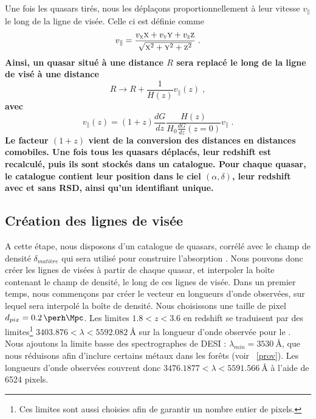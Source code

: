 \documentclass[11pt, twoside, a4paper, openright]{report}
\begin{document}
\paragraph{}
Une fois les quasars tirés, nous les déplaçons proportionnellement à leur vitesse $v_{\parallel}$ le long de la ligne de visée. Celle ci est définie comme
\begin{equation}
  v_{\parallel} = \frac{v_{\textsc{x}} \textsc{x} + v_{\textsc{y}} \textsc{y} + v_{\textsc{z}} \textsc{z}}{\sqrt{\textsc{x}^2 + \textsc{y}^2 + \textsc{z}^2}} \; .
\end{equation}
\textbf{Ainsi, un quasar situé à une distance $R$ sera replacé le long de la ligne de visé à une distance
\begin{equation}
 R \rightarrow  R + \frac{1}{H(z)} v_{\parallel}(z) \; ,  %
\end{equation}
avec
\begin{equation}
 v_{\parallel}(z) = (1+z) \frac{dG}{dz} \frac{H(z)}{H_0 \frac{dG}{dz}(z=0)} v_{\parallel} \; .
\end{equation}
Le facteur $(1+z)$ vient de la conversion des distances en distances comobiles. Une fois tous les quasars déplacés, leur redshift est recalculé, puis ils sont stockés dans un catalogue. Pour chaque quasar, le catalogue contient leur position dans le ciel $(\alpha, \delta)$, leur redshift avec et sans RSD, ainsi qu'un identifiant unique.}


\subsection{Création des lignes de visée}
\label{subsec:los_interp}
A cette étape, nous disposons d'un catalogue de quasars, corrélé avec le champ de densité $\delta_{matière}$ qui sera utilisé pour construire l'absorption \lya{}. Nous pouvons donc créer les lignes de visées à partir de chaque quasar, et interpoler la boîte contenant le champ de densité, le long de ces lignes de visée.
Dans un premier temps, nous commençons par créer le vecteur en longueurs d'onde observées, sur lequel sera interpolé la boîte de densité. Nous choisissons une taille de pixel $d_{pix} = \SI{0.2}{\perh\Mpc}$. Les limites $\num{1.8} < z < \num{3.6}$ en redshift se traduisent par des limites\footnote{Ces limites sont aussi choisies afin de garantir un nombre entier de pixels.} $\num{3403.876} < \lambda < \SI{5592.082}{\angstrom}$ sur la longueur d'onde observée pour le \lya{}. Nous ajoutons la limite basse des spectrographes de DESI : $\lambda_{min} = \SI{3530}{\angstrom}$, que nous réduisons afin d'inclure certains métaux dans les forêts (voir ~\ref{prov}). Les longueurs d'onde observées couvrent donc $\num{3476.1877} < \lambda < \SI{5591.566}{\angstrom}$ à l'aide de \num{6524} pixels.
\end{document}
